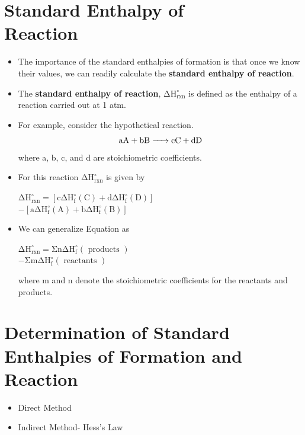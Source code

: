 \documentclass[a4paper,12pt,twocolumn]{article}
\begin{document}
\section{Standard Enthalpy of \\ Reaction}
\begin{itemize}
\item The importance of the standard enthalpies of formation is that once we know their values, we can readily calculate the \textbf{standard enthalpy of reaction}. 
\item The \textbf{standard enthalpy of reaction}, $\mathrm{\Delta H_{\mathrm{rxn}}^{\circ}}$ is defined as the enthalpy of a reaction carried out at 1 atm.
\item For example, consider the hypothetical reaction.
$$\ce{aA + bB -> cC + dD}$$
where a, b, c, and d are stoichiometric coefficients. 
\item For this reaction $\mathrm{\Delta H_{\mathrm{rxn}}^{\circ}}$ is given by
\begin{center}
$\mathrm{\Delta H_{\mathrm{rxn}}^{\circ}=\left[c \Delta H_{\mathrm{f}}^{\circ}(\mathrm{C})+d \Delta H_{\mathrm{f}}^{\circ}(\mathrm{D})\right]}$ \\ 
$\mathrm{- \left[a \Delta H_{\mathrm{f}}^{\circ}(\mathrm{A})+b \Delta H_{\mathrm{f}}^{\circ}(\mathrm{B})\right]}$
\end{center}
\item We can generalize Equation as
\begin{center}
$\mathrm{\Delta H_{\mathrm{rxn}}^{\circ}=\Sigma n \Delta H_{\mathrm{f}}^{\circ}(\text { products })}$ \\
$\mathrm{-\Sigma m \Delta H_{\mathrm{f}}^{\circ}(\text { reactants })}$
\end{center}
where m and n denote the stoichiometric coefficients for the reactants and products.
\end{itemize}

\section{Determination of Standard Enthalpies of Formation and Reaction}
\begin{itemize}
\item Direct Method
\item Indirect Method- Hess’s Law
\end{itemize}
\end{document}
